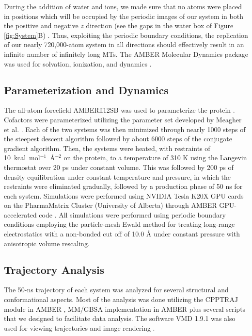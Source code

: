 \documentclass[11pt]{report}
\begin{document}
During
the addition of water and ions, we made sure that no atoms were placed in positions which will be occupied by the periodic images
of our system in both the positive and negative $z$ direction (see the 
gaps in the water box of Figure \ref{fig:System}B) . Thus,
exploiting the periodic boundary conditions, the replication of our nearly 720,000-atom system in all directions should effectively result in
an infinite number of infinitely long MTs.
The AMBER Molecular Dynamics package was used for solvation, ionization,
and dynamics \cite{case2012}.

\subsection{Parameterization and Dynamics} \label{Methods_param}The all-atom forcefield
AMBERff12SB was used to parameterize the protein \cite{Cornell1995,Hornak2006}.
Cofactors were parameterized utilizing the parameter set
developed by Meagher et al. \cite{Meagher2003}. Each of the two systems was then 
minimized through nearly 1000 steps of the steepest
descent algorithm followed by about 6000 steps of the conjugate 
gradient algorithm. 
Then, the systems were heated, with restraints of \mbox{10 kcal mol$^{-1}$ \r{A}$^{-2}$} on the protein, to a temperature of
310 K using the Langevin thermostat over 20 ps under constant volume.
This was followed by 200 ps of density equilibration under constant temperature
and pressure, in which the restraints were eliminated gradually, followed by a production phase of 50 ns for each system.
Simulations were performed using NVIDIA Tesla K20X GPU cards on the PharmaMatrix
Cluster (University of Alberta) through AMBER GPU-accelerated code
\cite{Salomon-Ferrer2013,Gotz2012,LeGrand2013}.
All simulations were performed using periodic
boundary conditions employing the particle-mesh Ewald method for
treating long-range electrostatics with a non-bonded cut off of
10.0 \r{A} under constant pressure with anisotropic 
volume rescaling.

\subsection{Trajectory Analysis}
\label{Methods_analysis} 
The 50-ns trajectory of each system was analyzed for 
several structural and conformational aspects.
Most of the analysis was done utilizing the CPPTRAJ module in 
AMBER \cite{Roe2013}, MM/GBSA implementation in
AMBER \cite{Miller2012} plus several scripts that we designed
to facilitate data analysis. The software VMD 1.9.1
was also used for viewing trajectories and image rendering \cite{Humphrey1996}.
\end{document}
